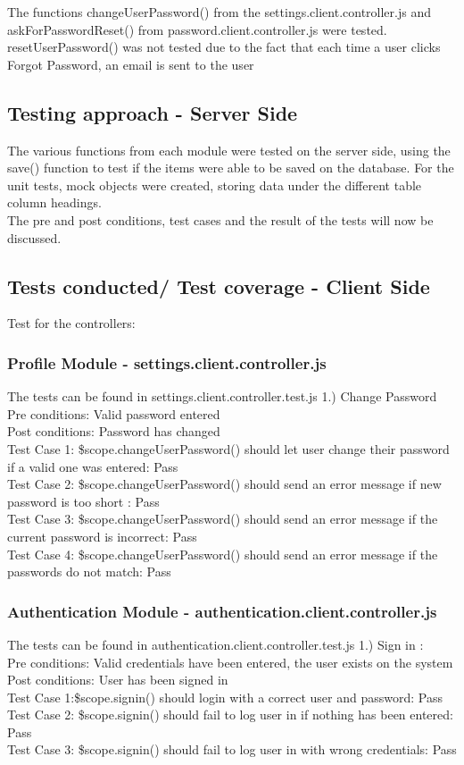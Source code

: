 \documentclass[a4paper,12pt]{article}
\begin{document}
The functions changeUserPassword() from the settings.client.controller.js and askForPasswordReset() from password.client.controller.js were tested. resetUserPassword() was not tested due to the fact that each time a user clicks Forgot Password, an email is sent to the user 
 
\subsection{Testing approach - Server Side}
The various functions from each module were tested on the server side, using the save() function to test if the items were able to be saved on the database. For the unit tests, mock objects were created, storing data under the different table column headings.
\\
The pre and post conditions, test cases and the result of the tests will now be discussed.

\subsection{Tests conducted/ Test coverage - Client Side}
Test for the controllers: 

\subsubsection{Profile Module - settings.client.controller.js}
The tests can be found in settings.client.controller.test.js
1.) Change Password
Pre conditions: Valid password entered
\\Post conditions: Password has changed
\\ Test Case 1: \$scope.changeUserPassword() should let user change their password if a valid one was entered: Pass
\\ Test Case 2: \$scope.changeUserPassword() should send an error message if new password is too short : Pass
\\ Test Case 3: \$scope.changeUserPassword()  should send an error message if the current password is incorrect: Pass
\\ Test Case 4: \$scope.changeUserPassword() should send an error message if the passwords do not match: Pass
 
\subsubsection{Authentication Module - authentication.client.controller.js }
The tests can be found in authentication.client.controller.test.js
1.) Sign in : \\
Pre conditions: Valid credentials have been entered, the user exists on the system
\\ Post conditions: User has been signed in
\\  Test Case 1:\$scope.signin() should login with a correct user and password: Pass
\\ Test Case 2: \$scope.signin() should fail to log user in if nothing has been entered: Pass
\\ Test Case 3: \$scope.signin()  should fail to log user in with wrong credentials: Pass
\end{document}
